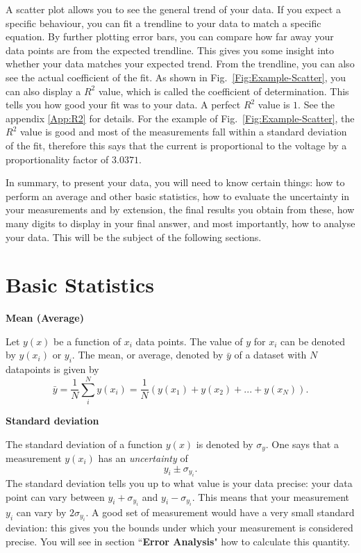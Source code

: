 \documentclass[12pt]{report}
\begin{document}
A scatter plot allows you to see the general trend of your data. If you expect a specific behaviour, you can fit a trendline to your data to match a specific equation. By further plotting error bars, you can compare how far away your data points are from the expected trendline. 
This gives you some insight into whether your data matches your expected trend. From the trendline, you can also see the actual coefficient of the fit. As shown in Fig.~\ref{Fig:Example-Scatter}, you can also display a $R^2$ value, which is called the coefficient of determination. This tells you how good your fit was to your data. A perfect $R^2$ value is $1$. See the appendix \ref{App:R2} for details.
For the example of Fig.~\ref{Fig:Example-Scatter}, the $R^2$ value is good and most of the measurements fall within a standard deviation of the fit, therefore this says that the current is proportional to the voltage by a proportionality factor of $3.0371$. 

In summary, to present your data, you will need to know certain things: how to perform an average and other basic statistics, how to evaluate the uncertainty in your measurements and by extension, the final results you obtain from these, how many digits to display in your final answer, and most importantly, how to analyse your data. This will be the subject of the following sections.

\section{Basic Statistics} \label{Sect:Basic-statistics}

\noindent \large \textbf{Mean (Average)} \normalsize

Let $y(x)$ be a function of $x_i$ data points. The value of $y$ for $x_i$ can be denoted by $y(x_i)$ or $y_i$. The mean, or average, denoted by $\bar{y}$ of a dataset with $N$ datapoints is given by
\begin{equation}
\bar{y} = \frac{1}{N} \displaystyle \sum_{i}^N y(x_i) = \frac{1}{N} \left( y(x_1) + y(x_2) +... + y(x_N) \right).
\end{equation}

\noindent \large \textbf{Standard deviation} \normalsize

The standard deviation of a function $y(x)$ is denoted by $\sigma_y$. One says that a measurement $y(x_i)$ has an \textit{uncertainty} of
\begin{equation}
y_i \pm \sigma_{y_i}.
\end{equation}
The standard deviation tells you up to what value is your data precise: your data point can vary between $y_i + \sigma_{y_i}$ and $y_i - \sigma_{y_i}$. This means that your measurement $y_i$ can vary by $2 \sigma_{y_i}$. A good set of measurement would have a very small standard deviation: this gives you the bounds under which your measurement is considered precise. You will see in section ``\textbf{Error Analysis}" how to calculate this quantity. \\
\end{document}
